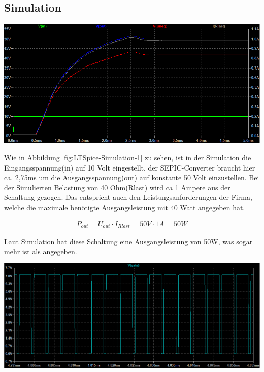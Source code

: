 \documentclass[paper=a4, 12pt]{scrreprt}
\begin{document}
		\subsection{Simulation}
			\begin{adjustbox}{center,caption={Simulation der Schaltung Mittels LTSpice},label={fig:LTSpice-Simulation-1},nofloat=figure,vspace=\bigskipamount}
				\includegraphics[width=\textwidth]{img/LTSpice_Simulation_1.PNG}
			\end{adjustbox}
			Wie in Abbildung \ref{fig:LTSpice-Simulation-1} zu sehen, ist in der Simulation die Eingangsspannung(in) auf 10 Volt eingestellt, der SEPIC-Converter braucht hier ca. 2,75ms um die Ausgangsspannung(out) auf konstante 50 Volt einzustellen. Bei der Simulierten Belastung von 40 Ohm(Rlast) wird ca 1 Ampere aus der Schaltung gezogen. Das entspricht auch den Leistungsanforderungen der Firma, welche die maximale benötigte Ausgangsleistung mit 40 Watt angegeben hat. 
			
			\begin{align*} 
			P_{out} = U_{out} \cdot I_{Rlast} = 50V \cdot 1A = 50W
			\end{align*} 
			
			Laut Simulation hat diese Schaltung eine Ausgangsleistung von 50W, was sogar mehr ist als angegeben. 
			
			\begin{adjustbox}{center,caption={Simulation der Schaltung Mittels LTSpice},label={fig:LTSpice-Simulation-2},nofloat=figure,vspace=\bigskipamount}
				\includegraphics[width=\textwidth]{img/LTSpice_Simulation_2.PNG}
			\end{adjustbox}
			
\end{document}
